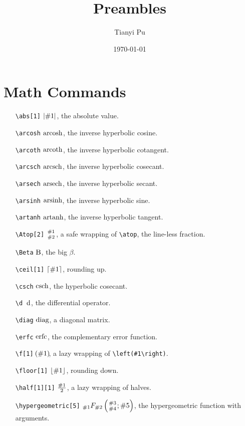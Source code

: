 \documentclass{article}
\title{Preambles}
\author{Tianyi Pu}
\date{\today}
\begin{document}
\maketitle

\section{Math Commands}
\begin{itemize}
    \item[\texttt{\textbackslash abs[1]}] $\abs{\#1}$, the absolute value.
    \item[\texttt{\textbackslash arcosh}] $\arcosh$, the inverse hyperbolic cosine.
    \item[\texttt{\textbackslash arcoth}] $\arcoth$, the inverse hyperbolic cotangent.
    \item[\texttt{\textbackslash arcsch}] $\arcsch$, the inverse hyperbolic cosecant.
    \item[\texttt{\textbackslash arsech}] $\arsech$, the inverse hyperbolic secant.
    \item[\texttt{\textbackslash arsinh}] $\arsinh$, the inverse hyperbolic sine.
    \item[\texttt{\textbackslash artanh}] $\artanh$, the inverse hyperbolic tangent.
    \item[\texttt{\textbackslash Atop[2]}] $\Atop{\#1}{\#2}$, a safe wrapping of \texttt{\textbackslash atop}, the line-less fraction.
    \item[\texttt{\textbackslash Beta}] $\Beta$, the big $\beta$.
    \item[\texttt{\textbackslash ceil[1]}] $\ceil{\#1}$, rounding up.
    \item[\texttt{\textbackslash csch}] $\csch$, the hyperbolic cosecant.
    \item[\texttt{\textbackslash d}] $\d$, the differential operator.
    \item[\texttt{\textbackslash diag}] $\diag$, a diagonal matrix.
    \item[\texttt{\textbackslash erfc}] $\erfc$, the complementary error function.
    \item[\texttt{\textbackslash f[1]}] $\f{\#1}$, a lazy wrapping of \texttt{\textbackslash left(\#1\textbackslash right)}.
    \item[\texttt{\textbackslash floor[1]}] $\floor{\#1}$, rounding down.
    \item[\texttt{\textbackslash half[1][1]}] $\half[\#1]$, a lazy wrapping of halves.
    \item[\texttt{\textbackslash hypergeometric[5]}] $\hypergeometric{\#1}{\#2}{\#3}{\#4}{\#5}$, the hypergeometric function with arguments.

\end{itemize}
\end{document}
